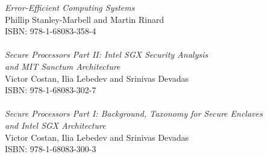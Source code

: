 \vspace{12pt}
\noindent \textit{Error-Efficient Computing Systems}\\
Phillip Stanley-Marbell and Martin Rinard\\
ISBN: 978-1-68083-358-4\\
\\
\noindent \textit{Secure Processors Part II: Intel SGX Security Analysis\\ and MIT Sanctum Architecture}\\
Victor Costan, Ilia Lebedev and Srinivas Devadas\\
ISBN: 978-1-68083-302-7\\
\\
\noindent \textit{Secure Processors Part I: Background, Taxonomy for Secure Enclaves\\ and Intel SGX Architecture}\\
Victor Costan, Ilia Lebedev and Srinivas Devadas\\
ISBN: 978-1-68083-300-3
